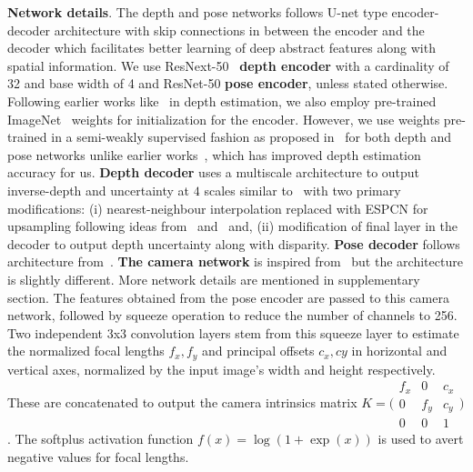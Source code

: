 \documentclass{bmvc2k}
\begin{document}
\textbf{Network details}. The depth and pose networks follows U-net type encoder-decoder architecture with skip connections in between the encoder and the decoder which facilitates better learning of deep abstract features along with spatial information. We use ResNext-50~\cite{xie2017aggregated} \textbf{depth encoder} with a cardinality of 32 and base width of 4 and ResNet-50 \textbf{pose encoder}, unless stated otherwise. Following earlier works like~\cite{guo2018learning,godard2019digging, kuznietsov2017semi, johnston2020self} in depth estimation, we also employ pre-trained ImageNet~\cite{russakovsky2015imagenet} weights for initialization for the encoder. However, we use weights pre-trained in a semi-weakly supervised fashion as proposed in~\cite{yalniz2019billion} for both depth and pose networks unlike earlier works~\cite{godard2017unsupervised,godard2019digging,guizilini20203d}, which has improved depth estimation accuracy for us. \textbf{Depth decoder} uses a multiscale architecture to output inverse-depth and uncertainty at $4$ scales similar to~\cite{godard2019digging} with two primary modifications: (i) nearest-neighbour interpolation replaced with ESPCN for upsampling following ideas from~\cite{shi2016real} and~\cite{aitken2017checkerboard} and, (ii) modification of final layer in the decoder to output depth uncertainty along with disparity. \textbf{Pose decoder} follows architecture from~\cite{godard2019digging}. \textbf{The camera network} is inspired from~\cite{gordon2019depth} but the architecture is slightly different. More network details are mentioned in supplementary section. The features obtained from the pose encoder are passed to this camera network, followed by squeeze operation to reduce the number of channels to 256. Two independent 3x3 convolution layers stem from this squeeze layer to estimate the normalized focal lengths $f_x,f_y$ and principal offsets $c_x,cy$ in horizontal and vertical axes, normalized by the input image's width and height respectively. These are concatenated to output the camera intrinsics matrix $K = \Big(\begin{smallmatrix}
  f_x & 0 & c_x\\
  0 & f_y & c_y\\
  0 & 0 & 1
\end{smallmatrix}\Big)$. The softplus activation function $f\left(x\right) = \log\left(1+\exp\left(x\right)\right)$ is used to avert negative values for focal lengths. 
\end{document}
